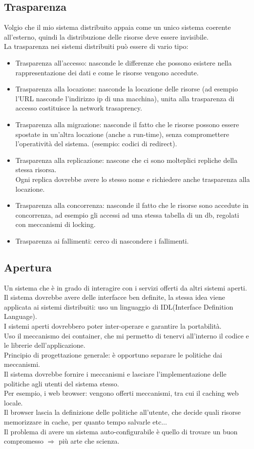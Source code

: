 \documentclass[16px]{article}
\begin{document}
\subsection{Trasparenza}
Volgio che il mio sistema distribuito appaia come un unico sistema coerente all'esterno, quindi la distribuzione delle risorse deve essere invisibile.\\La trasparenza nei sistemi distribuiti può essere di vario tipo:
\begin{itemize}
\item Trasparenza all'accesso: nasconde le differenze che possono esistere nella rappresentazione dei dati e come le risorse vengono accedute.
\item Trasparenza alla locazione: nasconde la locazione delle risorse (ad esempio l'URL nasconde l'indirizzo ip di una macchina), unita alla trasparenza di accesso costituisce la network trasaprency.
\item Trasparenza alla migrazione: nasconde il fatto che le risorse possono essere spostate in un'altra locazione (anche a run-time), senza compromettere l'operatività del sistema. (esempio: codici di redirect).
\item Trasparenza alla replicazione: nascone che ci sono molteplici repliche della stessa risorsa.\\ Ogni replica dovrebbe avere lo stesso nome e richiedere anche trasparenza alla locazione.
\item Trasparenza alla concorrenza: nasconde il fatto che le risorse sono accedute in concorrenza, ad esempio gli accessi ad una stessa tabella di un db, regolati con meccanismi di locking.
\item Trasparenza ai fallimenti: cerco di nascondere i fallimenti.
\end{itemize}
\subsection{Apertura}
Un sistema che è in grado di interagire con i servizi offerti da altri sistemi aperti.\\ Il sistema dovrebbe avere delle interfacce ben definite, la stessa idea viene applicata ai sistemi distribuiti: uso un linguaggio di IDL(Interface Definition Language).\\ I sistemi aperti dovrebbero poter inter-operare  e garantire la portabilità.\\ Uso il meccanismo dei container, che mi permetto di tenervi all'interno il codice e le librerie dell'applicazione.\\ Principio di progettazione generale: è opportuno separare le politiche dai meccanismi.\\ Il sistema dovrebbe fornire i meccanismi e lasciare l'implementazione delle politiche agli utenti del sistema stesso.\\ Per esempio, i web browser: vengono offerti meccanismi, tra cui il caching web locale.\\ Il browser lascia la definizione delle politiche all'utente, che decide quali risorse memorizzare in cache, per quanto tempo salvarle etc...\\ Il problema di avere un sistema auto-configurabile è quello di trovare un buon compromesso $\Rightarrow$ più arte che scienza.
\end{document}
